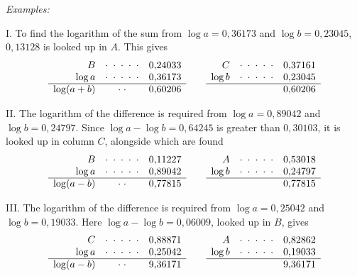 \begin{center}\textit{Examples:}\end{center}

I. To find the logarithm of the sum from $\log a=0{,}36173$ and $\log b=0{,}23045$, $0{,}13128$ is looked up in $A$. This gives
\[
\begin{array}{rcr}
B&\cdot\;\cdot\;\cdot\;\cdot\;\cdot&0{,}24033\\
\log a&\cdot\;\cdot\;\cdot\;\cdot\;\cdot&0{,}36173\\\hline
\log(a+b)&\cdot\;\cdot&0{,}60206
\end{array}
\qquad
\begin{array}{rcr}
C&\cdot\;\cdot\;\cdot\;\cdot\;\cdot&0{,}37161\\
\log b&\cdot\;\cdot\;\cdot\;\cdot\;\cdot&0{,}23045\\\hline
&&0{,}60206
\end{array}
\]

II. The logarithm of the difference is required from $\log a=0{,}89042$ and $\log b=0{,}24797$. Since $\log a-\log b=0{,}64245$ is greater than $0{,}30103$, it is looked up in column $C$, alongside which are found
\[
\begin{array}{rcr}
B&\cdot\;\cdot\;\cdot\;\cdot\;\cdot&0{,}11227\\
\log a&\cdot\;\cdot\;\cdot\;\cdot\;\cdot&0{,}89042\\\hline
\log(a-b)&\cdot\;\cdot&0{,}77815
\end{array}
\qquad
\begin{array}{rcr}
A&\cdot\;\cdot\;\cdot\;\cdot\;\cdot&0{,}53018\\
\log b&\cdot\;\cdot\;\cdot\;\cdot\;\cdot&0{,}24797\\\hline
&&0{,}77815
\end{array}
\]

III. The logarithm of the difference is required from $\log a=0{,}25042$ and $\log b=0{,}19033$. Here $\log a-\log b=0{,}06009$, looked up in $B$, gives
\[
\begin{array}{rcr}
C&\cdot\;\cdot\;\cdot\;\cdot\;\cdot&0{,}88871\\
\log a&\cdot\;\cdot\;\cdot\;\cdot\;\cdot&0{,}25042\\\hline
\log(a-b)&\cdot\;\cdot&9{,}36171
\end{array}
\qquad
\begin{array}{rcr}
A&\cdot\;\cdot\;\cdot\;\cdot\;\cdot&0{,}82862\\
\log b&\cdot\;\cdot\;\cdot\;\cdot\;\cdot&0{,}19033\\\hline
&&9{,}36171
\end{array}
\]

